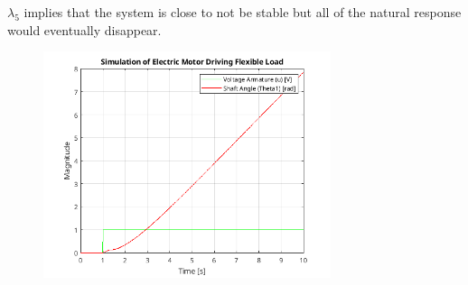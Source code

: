 \documentclass{article}
\begin{document}
$\lambda_5$ implies that the system is close to not be stable but all of the natural response would eventually disappear.

\begin{figure}[H]
    \centering
    \includegraphics[width=0.75\textwidth]{rotorSim.png}
\end{figure}
\end{document}
